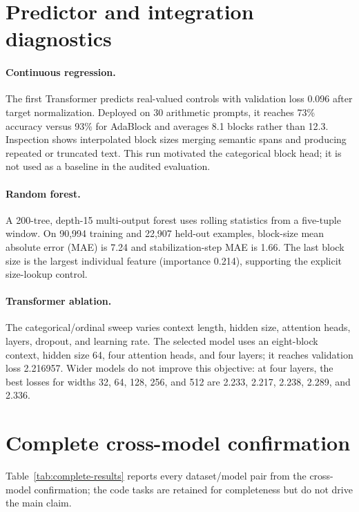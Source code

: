 \documentclass{article}
\begin{document}
\section{Predictor and integration diagnostics}
\label{app:predictors}

\paragraph{Continuous regression.}
The first Transformer predicts real-valued controls with validation loss 0.096 after target normalization. Deployed on 30 arithmetic prompts, it reaches 73\% accuracy versus 93\% for AdaBlock and averages 8.1 blocks rather than 12.3. Inspection shows interpolated block sizes merging semantic spans and producing repeated or truncated text. This run motivated the categorical block head; it is not used as a baseline in the audited evaluation.

\paragraph{Random forest.}
A 200-tree, depth-15 multi-output forest uses rolling statistics from a five-tuple window. On 90{,}994 training and 22{,}907 held-out examples, block-size mean absolute error (MAE) is 7.24 and stabilization-step MAE is 1.66. The last block size is the largest individual feature (importance 0.214), supporting the explicit size-lookup control.

\paragraph{Transformer ablation.}
The categorical/ordinal sweep varies context length, hidden size, attention heads, layers, dropout, and learning rate. The selected model uses an eight-block context, hidden size 64, four attention heads, and four layers; it reaches validation loss 2.216957. Wider models do not improve this objective: at four layers, the best losses for widths 32, 64, 128, 256, and 512 are 2.233, 2.217, 2.238, 2.289, and 2.336.

\section{Complete cross-model confirmation}
\label{app:complete-results}

Table~\ref{tab:complete-results} reports every dataset/model pair from the cross-model confirmation; the code tasks are retained for completeness but do not drive the main claim.
\end{document}
